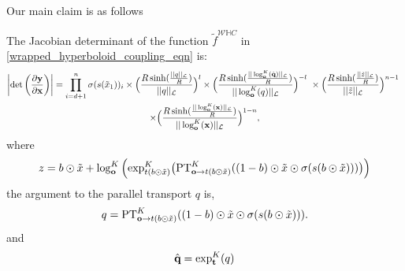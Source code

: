 Our main claim is as follows
\begin{prop}
The Jacobian determinant of the function $\tilde{f}^{\mathcal{W}\mathbb{H}C}$ in \eqref{wrapped_hyperboloid_coupling_eqn} is:
\begin{multline}
  \left|\textnormal{det}\left(\frac{\partial\mb{y}}{\partial \mb{x}}\right)\right| = \prod_{i=d+1}^n\sigma(s(\tilde{x}_1))_i \times \Big(\frac{R \sinh(\frac{||q||_{\mathcal{L}}}{R})}{||q||_{\mathcal{L}}}\Big)^{l}
  \times \Big(\frac{R\sinh(\frac{||\log_{\textbf{o}}^K(\hat{\textbf{q}})||_{\mathcal{L}}}{R})}{||\log_{\textbf{o}}^K(q)||_{\mathcal{L}}}\Big)^{-l} \ \times  \Big(\frac{R\sinh(\frac{||\tilde{z}||_{\mathcal{L}}}{R})}{||\tilde{z}||_{\mathcal{L}}}\Big)^{n-1}
 \  \\ \times \Big(\frac{R\sinh(\frac{||\log_{\textbf{o}}^K(\textbf{x})||_{\mathcal{L}}}{R})}{||\log_{\textbf{o}}^K(\textbf{x})||_{\mathcal{L}}}\Big)^{1-n},
\end{multline}
where 
$$
z =  b \odot \tilde{
    x} + \log^K_{\textbf{o}}\Big( \textnormal{exp}^K_{t(b \odot \tilde{x})}\big(\textnormal{PT}^K_{\textbf{o}\to t(b \odot \tilde{x}) }((1-b) \odot \tilde{x} \odot \sigma(s(b \odot \tilde{x})))\big)\Big)
$$
the argument to the parallel transport $q$ is,
$$
 q = \textnormal{PT}^K_{\textbf{o}\to t(b \odot \tilde{x}) }((1-b) \odot \tilde{x} \odot \sigma(s(b \odot \tilde{x}))). 
$$
and
$$
\hat{\textbf{q}} = \textnormal{exp}_{\textbf{t}}^K(q)
$$
\end{prop}
